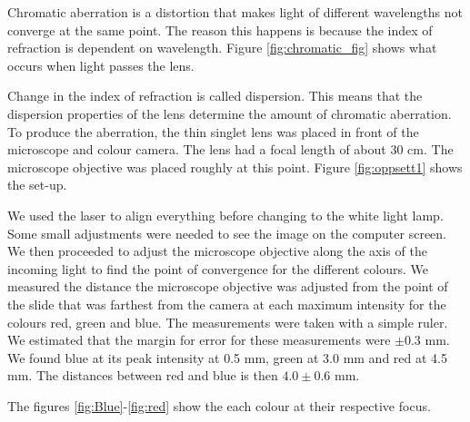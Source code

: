 Chromatic aberration is a distortion that makes light of different wavelengths not converge at the same point. The reason this happens is because the index of refraction is dependent on wavelength. Figure \vref{fig:chromatic_fig} shows what occurs when light passes the lens.


 Change in the index of refraction is called dispersion. This means that the dispersion properties of the lens determine the amount of chromatic aberration. To produce the aberration, the thin singlet lens was placed in front of the microscope and colour camera. The lens had a focal length of about 30 cm. The microscope objective was placed roughly at this point. Figure \vref{fig:oppsett1} shows the set-up. 


We used the laser to align everything before changing to the white light lamp. Some small adjustments were needed to see the image on the computer screen. We then proceeded to adjust the microscope objective along the axis of the incoming light to find the point of convergence for the different colours. We measured the distance the microscope objective was adjusted from the point of the slide that was farthest from the camera at each maximum intensity for the colours red, green and blue. The measurements were taken with a simple ruler. We estimated that the margin for error for these measurements were $\pm 0.3$ mm. We found blue at its peak intensity at 0.5 mm, green at 3.0 mm and red at 4.5 mm. The distances between red and blue is then $4.0 \pm 0.6$ mm.


The figures \vref{fig:Blue}-\vref{fig:red} show the each colour at their respective focus.

